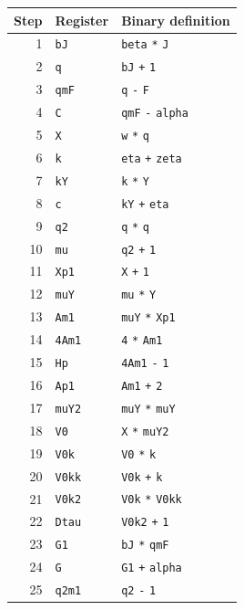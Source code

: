 \begingroup\small
\begin{longtable}{@{}rll@{}}
\toprule Step & Register & Binary definition\\\midrule\endhead
1 & \texttt{bJ} & \texttt{beta} \texttt{*} \texttt{J}\\
2 & \texttt{q} & \texttt{bJ} \texttt{+} \texttt{1}\\
3 & \texttt{qmF} & \texttt{q} \texttt{-} \texttt{F}\\
4 & \texttt{C} & \texttt{qmF} \texttt{-} \texttt{alpha}\\
5 & \texttt{X} & \texttt{w} \texttt{*} \texttt{q}\\
6 & \texttt{k} & \texttt{eta} \texttt{+} \texttt{zeta}\\
7 & \texttt{kY} & \texttt{k} \texttt{*} \texttt{Y}\\
8 & \texttt{c} & \texttt{kY} \texttt{+} \texttt{eta}\\
9 & \texttt{q2} & \texttt{q} \texttt{*} \texttt{q}\\
10 & \texttt{mu} & \texttt{q2} \texttt{+} \texttt{1}\\
11 & \texttt{Xp1} & \texttt{X} \texttt{+} \texttt{1}\\
12 & \texttt{muY} & \texttt{mu} \texttt{*} \texttt{Y}\\
13 & \texttt{Am1} & \texttt{muY} \texttt{*} \texttt{Xp1}\\
14 & \texttt{4Am1} & \texttt{4} \texttt{*} \texttt{Am1}\\
15 & \texttt{Hp} & \texttt{4Am1} \texttt{-} \texttt{1}\\
16 & \texttt{Ap1} & \texttt{Am1} \texttt{+} \texttt{2}\\
17 & \texttt{muY2} & \texttt{muY} \texttt{*} \texttt{muY}\\
18 & \texttt{V0} & \texttt{X} \texttt{*} \texttt{muY2}\\
19 & \texttt{V0k} & \texttt{V0} \texttt{*} \texttt{k}\\
20 & \texttt{V0kk} & \texttt{V0k} \texttt{+} \texttt{k}\\
21 & \texttt{V0k2} & \texttt{V0k} \texttt{*} \texttt{V0kk}\\
22 & \texttt{Dtau} & \texttt{V0k2} \texttt{+} \texttt{1}\\
23 & \texttt{G1} & \texttt{bJ} \texttt{*} \texttt{qmF}\\
24 & \texttt{G} & \texttt{G1} \texttt{+} \texttt{alpha}\\
25 & \texttt{q2m1} & \texttt{q2} \texttt{-} \texttt{1}\\

\end{longtable}
